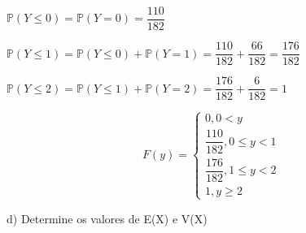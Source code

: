 \documentclass[12pt,a4paper]{article}
\begin{document}
\vspace{1cm}

\begin{center}
	\vspace{0.25cm}
	$\mathbb{P}(Y\leq{0}) = \mathbb{P}(Y=0) = \dfrac{110}{182}$
	
	\vspace{0.5cm}
	$\mathbb{P}(Y\leq1) = \mathbb{P}(Y\leq{0}) + \mathbb{P}(Y=1) = \dfrac{110}{182} + \dfrac{66}{182} = \dfrac{176}{182}$
	
	\vspace{0.5cm}
	$\mathbb{P}(Y\leq{2}) = \mathbb{P}(Y\leq1) + \mathbb{P}(Y=2) = \dfrac{176}{182} + \dfrac{6}{182} = 1$
	
	\[
	F(y) =
	\begin{cases}
	0, 0 < y \\
	\dfrac{110}{182}, 0\leq{y} < 1 \\
	\dfrac{176}{182}, 1\leq{y} < 2\\
	1,y\geq{2}
	\end{cases}
	\]
	
	\vspace{1cm}
\end{center}

\vspace{1cm}
d) Determine os valores de E(X) e V(X)
\end{document}
